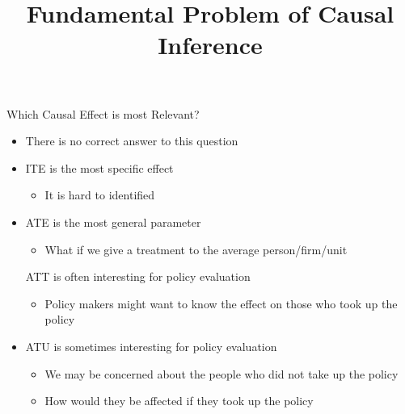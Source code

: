 \documentclass[hyperref={pdfpagelabels=false}]{beamer}
\begin{document}
\begin{frame}{Which Causal Effect is most Relevant?}
	\begin{itemize}	
		
		\item There is no correct answer to this question
				\vspace{0.2cm}
		\item ITE is the most specific effect		
					\vspace{0.2cm}
				\begin{itemize}	
					\item It is hard to identified
													\vspace{0.2cm}
				\end{itemize}
		\item ATE is the most general parameter
				\vspace{0.2cm}
			\begin{itemize}	
		\item What if we give a treatment to the average person/firm/unit 
			\end{itemize}
						\vspace{0.2cm}
		ATT is often interesting for policy evaluation
								\vspace{0.2cm}
				\begin{itemize}	
			\item Policy makers might want to know the effect on those who took up the policy
		\end{itemize}
									\vspace{0.2cm}
	\item ATU is sometimes interesting for policy evaluation
			\vspace{0.2cm}
		\begin{itemize}	
			\item We may be concerned about the people who did not take up the policy
						\vspace{0.2cm}
			\item How would they be affected if they took up the policy
		\end{itemize}
		
	\end{itemize}
	
\end{frame}










\title[]  
{Fundamental Problem of Causal Inference}
\end{document}
